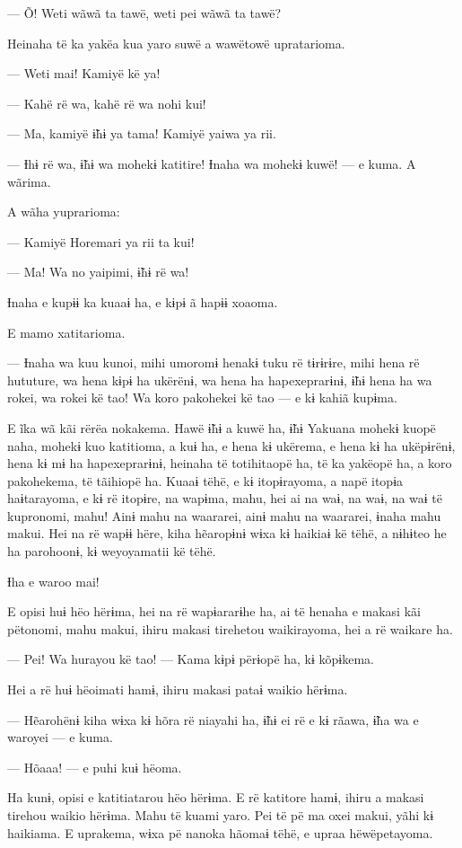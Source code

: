 --- Õ! Weti wãwã ta tawë, weti pei wãwã ta tawë?

Heinaha të ka yakëa kua yaro suwë a wawëtowë upratarioma. 

--- Weti mai! Kamiyë kë ya!

--- Kahë rë wa, kahë rë wa nohi kui!

--- Ma, kamiyë ɨ̃hɨ ya tama! Kamiyë yaiwa ya rii.

--- Ɨhɨ rë wa, ɨ̃hɨ wa mohekɨ katitire! Ɨnaha wa mohekɨ kuwë! --- e kuma.
A wãrima. 

A wãha yuprarioma: 

--- Kamiyë Horemari ya rii ta kui!

--- Ma! Wa no yaipimi, ɨ̃hɨ rë wa! 

Ɨnaha e kupɨɨ ka kuaaɨ ha, e kɨpɨ ã hapɨɨ xoaoma. 

E mamo xatitarioma. 

--- Ɨnaha wa kuu kunoi, mihi umoromɨ henakɨ tuku rë tɨrɨrɨre, mihi hena
rë hututure, wa hena kɨpɨ ha ukërënɨ, wa hena ha hapexeprarɨnɨ, ɨ̃hɨ hena
ha wa rokei, wa rokei kë tao! Wa koro pakohekei kë tao --- e kɨ kahiã
kupɨma.

 

E ĩka wã kãi rërëa nokakema. Hawë ɨ̃hɨ a kuwë ha, ɨ̃hɨ Yakuana mohekɨ
kuopë naha, mohekɨ kuo katitioma, a kuɨ ha, e hena kɨ ukërema, e hena kɨ
ha ukëpɨrënɨ, hena kɨ mɨ ha hapexeprarɨnɨ, heinaha të totihitaopë ha, të
ka yakëopë ha, a koro pakohekema, të tãihiopë ha. Kuaaɨ tëhë, e kɨ
itopɨrayoma, a napë itopɨa haɨtarayoma, e kɨ rë itopɨre, na wapɨma,
mahu, hei ai na waɨ, na waɨ, na waɨ të kupronomi, mahu! Ainɨ mahu na
waararei, ainɨ mahu na waararei, ɨnaha mahu makui. Hei na rë wapɨɨ hëre,
kiha hẽaropɨnɨ wɨxa kɨ haikiaɨ kë tëhë, a nɨhɨteo he ha parohoonɨ, kɨ
weyoyamatii kë tëhë. 

Ɨha e waroo mai! 

E opisi huɨ hëo hërɨma, hei na rë wapɨararɨhe ha, ai të henaha e makasi
kãi pëtonomi, mahu makui, ihiru makasi tirehetou waikirayoma, hei a rë
waikare ha. 

--- Pei! Wa hurayou kë tao! --- Kama kɨpɨ përɨopë ha, kɨ kõpɨkema. 

Hei a rë huɨ hëoimati hamɨ, ihiru makasi pataɨ waikio hërɨma. 

--- Hẽarohënɨ kiha wɨxa kɨ hõra rë niayahi ha, ɨ̃hɨ ei rë e kɨ rãawa, ɨ̃ha
wa e waroyei --- e kuma. 

--- Hõaaa! --- e puhi kuɨ hëoma. 

Ha kunɨ, opisi e katitiatarou hëo hërɨma. E rë katitore hamɨ, ihiru a
makasi tirehou waikio hërɨma. Mahu të kuami yaro. Pei të pë ma oxei
makui, yãhi kɨ haikiama. E uprakema, wɨxa pë nanoka hãomaɨ tëhë, e upraa
hëwëpetayoma. 

